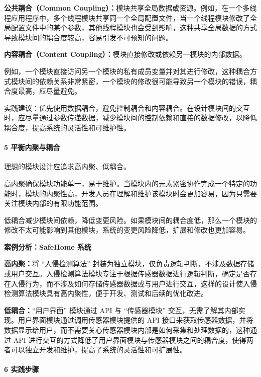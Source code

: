 \textbf{公共耦合（Common Coupling）：}模块共享全局数据或资源。例如，在一个多线程应用程序中，多个线程模块共享同一个全局配置文件，当一个线程模块修改了全局配置文件中的某个参数，其他线程模块也会受到影响，这种共享全局数据的方式导致模块间的耦合度较高，容易引发不可预知的问题。

\textbf{内容耦合（Content Coupling）：}模块直接修改或依赖另一模块的内部数据。

例如，一个模块直接访问另一个模块的私有成员变量并对其进行修改，这种耦合方式模块间的依赖关系非常紧密，一个模块的修改很可能导致另一个模块的错误，耦合度最高，应尽量避免。

实践建议：优先使用数据耦合，避免控制耦合和内容耦合。在设计模块间的交互时，应尽量通过参数传递数据，减少模块间的控制依赖和直接的数据修改，以降低耦合度，提高系统的灵活性和可维护性。

\paragraph{5 平衡内聚与耦合}\label{ux5e73ux8861ux5185ux805aux4e0eux8026ux5408}

理想的模块设计应追求高内聚、低耦合。

高内聚确保模块功能单一，易于维护。当模块内的元素紧密协作完成一个特定的功能时，模块的内聚性高，开发人员在理解和维护该模块时会更加容易，因为只需要关注模块内部的有限功能范围。

低耦合减少模块间依赖，降低变更风险。如果模块间的耦合度低，那么一个模块的修改不太可能影响到其他模块，系统的变更风险降低，扩展和修改也更加容易。

\textbf{案例分析：SafeHome 系统}

\textbf{高内聚：}将 ``入侵检测算法'' 封装为独立模块，仅负责逻辑判断，不涉及数据存储或用户交互。入侵检测算法模块专注于根据传感器数据进行逻辑判断，确定是否存在入侵行为，而不涉及如何存储传感器数据或与用户进行交互，这样的设计使入侵检测算法模块具有高内聚性，便于开发、测试和后续的优化改进。

\textbf{低耦合：}``用户界面'' 模块通过 API 与 ``传感器模块'' 交互，无需了解其内部实现。用户界面模块通过调用传感器模块提供的 API 接口来获取传感器数据，并将数据显示给用户，而不需要关心传感器模块内部是如何采集和处理数据的，这种通过 API 进行交互的方式降低了用户界面模块与传感器模块之间的耦合度，使得两者可以独立开发和维护，提高了系统的灵活性和可扩展性。

\paragraph{6 实践步骤}\label{ux5b9eux8df5ux6b65ux9aa4}

